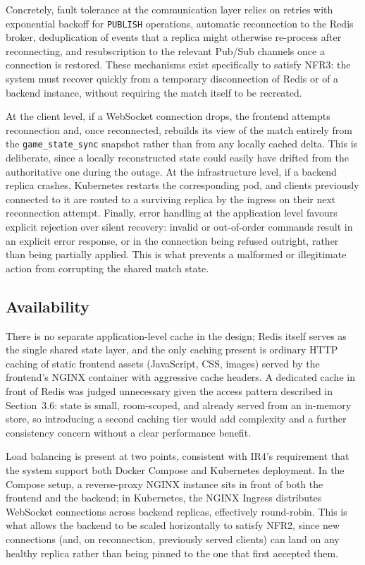 \documentclass{scrartcl}
\begin{document}
Concretely, fault tolerance at the communication layer relies on retries with exponential backoff for \texttt{PUBLISH} operations, automatic reconnection to the Redis broker, deduplication of events that a replica might otherwise re-process after reconnecting, and resubscription to the relevant Pub/Sub channels once a connection is restored. These mechanisms exist specifically to satisfy NFR3: the system must recover quickly from a temporary disconnection of Redis or of a backend instance, without requiring the match itself to be recreated.

At the client level, if a WebSocket connection drops, the frontend attempts reconnection and, once reconnected, rebuilds its view of the match entirely from the \texttt{game\_state\_sync} snapshot rather than from any locally cached delta. This is deliberate, since a locally reconstructed state could easily have drifted from the authoritative one during the outage. At the infrastructure level, if a backend replica crashes, Kubernetes restarts the corresponding pod, and clients previously connected to it are routed to a surviving replica by the ingress on their next reconnection attempt. Finally, error handling at the application level favours explicit rejection over silent recovery: invalid or out-of-order commands result in an explicit error response, or in the connection being refused outright, rather than being partially applied. This is what prevents a malformed or illegitimate action from corrupting the shared match state.

\subsection{Availability}

There is no separate application-level cache in the design; Redis itself serves as the single shared state layer, and the only caching present is ordinary HTTP caching of static frontend assets (JavaScript, CSS, images) served by the frontend's NGINX container with aggressive cache headers. A dedicated cache in front of Redis was judged unnecessary given the access pattern described in Section~3.6: state is small, room-scoped, and already served from an in-memory store, so introducing a second caching tier would add complexity and a further consistency concern without a clear performance benefit.

Load balancing is present at two points, consistent with IR4's requirement that the system support both Docker Compose and Kubernetes deployment. In the Compose setup, a reverse-proxy NGINX instance sits in front of both the frontend and the backend; in Kubernetes, the NGINX Ingress distributes WebSocket connections across backend replicas, effectively round-robin. This is what allows the backend to be scaled horizontally to satisfy NFR2, since new connections (and, on reconnection, previously served clients) can land on any healthy replica rather than being pinned to the one that first accepted them.
\end{document}
